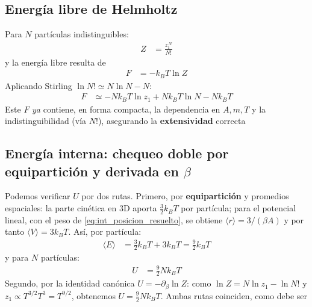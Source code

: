 \documentclass{article}
\begin{document}
\subsection*{Energía libre de Helmholtz}

Para $N$ partículas indistinguibles:
\begin{equation}
\begin{split}
Z
&= \frac{z_1^{\,N}}{N!}
\end{split}\label{eq:Z_total_final}
\end{equation}
y la energía libre resulta de
\begin{equation}
\begin{split}
F
&= -k_B T \ln Z
\end{split}\label{eq:F_def_canonico}
\end{equation}
Aplicando Stirling $\ln N!\simeq N\ln N - N$:
\begin{equation}
\begin{split}
F
&\simeq -N k_B T \ln z_1 + N k_B T \ln N - N k_B T
\end{split}\label{eq:F_stirling}
\end{equation}
Este $F$ \textit{ya} contiene, en forma compacta, la dependencia en $A,m,T$ y la indistinguibilidad (vía $N!$), asegurando la \textbf{extensividad} correcta

\subsection*{Energía interna: chequeo doble por equipartición y derivada en $\beta$}

Podemos verificar $U$ por dos rutas. Primero, por \textbf{equipartición} y promedios espaciales: la parte cinética en 3D aporta $\tfrac{3}{2}k_B T$ por partícula; para el potencial lineal, con el peso de \eqref{eq:int_posicion_resuelto}, se obtiene $\langle r\rangle=3/(\beta A)$ y por tanto $\langle V\rangle=3 k_B T$. Así, por partícula:
\begin{equation}
\begin{split}
\langle E\rangle
&= \frac{3}{2}k_B T + 3 k_B T
= \frac{9}{2} k_B T
\end{split}\label{eq:E_media_particula}
\end{equation}
y para $N$ partículas:
\begin{equation}
\begin{split}
U
&= \frac{9}{2} N k_B T
\end{split}\label{eq:U_por_equiparticion}
\end{equation}
Segundo, por la identidad canónica $U=-\partial_\beta\ln Z$: como $\ln Z = N\ln z_1 - \ln N!$ y $z_1\propto T^{3/2} T^3 = T^{9/2}$, obtenemos $U= \tfrac{9}{2} N k_B T$. Ambas rutas coinciden, como debe ser
\end{document}
